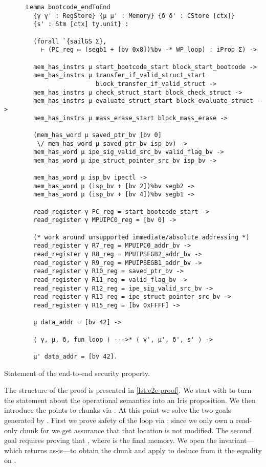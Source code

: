 \begin{listing}[p]
  \begin{verbatim}
      Lemma bootcode_endToEnd
        {γ γ' : RegStore} {μ μ' : Memory} {δ δ' : CStore [ctx]}
        {s' : Stm [ctx] ty.unit} :

        (forall `{sailGS Σ},
          ⊢ (PC_reg ↦ (segb1 + [bv 0x8])%bv -* WP_loop) : iProp Σ) ->

        mem_has_instrs μ start_bootcode_start block_start_bootcode ->
        mem_has_instrs μ transfer_if_valid_struct_start
                         block_transfer_if_valid_struct ->
        mem_has_instrs μ check_struct_start block_check_struct ->
        mem_has_instrs μ evaluate_struct_start block_evaluate_struct ->
        mem_has_instrs μ mass_erase_start block_mass_erase ->

        (mem_has_word μ saved_ptr_bv [bv 0]
         \/ mem_has_word μ saved_ptr_bv isp_bv) ->
        mem_has_word μ ipe_sig_valid_src_bv valid_flag_bv ->
        mem_has_word μ ipe_struct_pointer_src_bv isp_bv ->

        mem_has_word μ isp_bv ipectl ->
        mem_has_word μ (isp_bv + [bv 2])%bv segb2 ->
        mem_has_word μ (isp_bv + [bv 4])%bv segb1 ->

        read_register γ PC_reg = start_bootcode_start ->
        read_register γ MPUIPC0_reg = [bv 0] ->

        (* work around unsupported immediate/absolute addressing *)
        read_register γ R7_reg = MPUIPC0_addr_bv ->
        read_register γ R8_reg = MPUIPSEGB2_addr_bv ->
        read_register γ R9_reg = MPUIPSEGB1_addr_bv ->
        read_register γ R10_reg = saved_ptr_bv ->
        read_register γ R11_reg = valid_flag_bv ->
        read_register γ R12_reg = ipe_sig_valid_src_bv ->
        read_register γ R13_reg = ipe_struct_pointer_src_bv ->
        read_register γ R15_reg = [bv 0xFFFF] ->

        μ data_addr = [bv 42] ->

        ⟨ γ, μ, δ, fun_loop ⟩ --->* ⟨ γ', μ', δ', s' ⟩ ->

        μ' data_addr = [bv 42].
  \end{verbatim}
  \caption{Statement of the end-to-end security property.}
  \label{lst:e2e}
\end{listing}

The structure of the proof is presented in \cref{lst:e2e-proof}. We start with  to turn the statement about the operational semantics into an Iris proposition. We then introduce the points-to chunks via . At this point we solve the two goals generated by . First we prove safety of the loop via ; since we only own a read-only chunk for  we get assurance that that location is not modified. The second goal requires proving that , where  is the final memory. We open the invariant---which  returns as-is---to obtain the  chunk and apply  to deduce from it the equality on .


